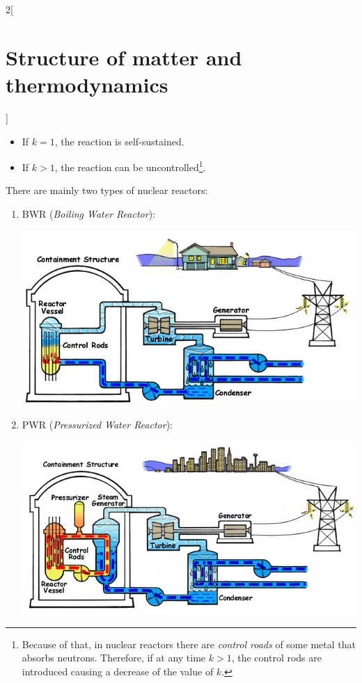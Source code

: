 \documentclass[../../../main_physics.tex]{subfiles}
\begin{document}
\begin{multicols}{2}[\section{Structure of matter and thermodynamics}]
\begin{definition}
\begin{itemize}
      \item If $k=1$, the reaction is self-sustained.
      \item If $k>1$, the reaction can be uncontrolled\footnote{Because of that, in nuclear reactors there are \emph{control roads} of some metal that absorbs neutrons. Therefore, if at any time $k>1$, the control rods are introduced causing a decrease of the value of $k$.}.
    \end{itemize}
  \end{definition}
  \begin{definition}
    There are mainly two types of nuclear reactors:
    \begin{enumerate}
      \item BWR (\emph{Boiling Water Reactor}):
            \begin{center}
              \begin{minipage}{\linewidth}
                \centering
                \includegraphics[width=\linewidth]{Images/bwr.jpg}
              \end{minipage}
            \end{center}
      \item PWR (\emph{Pressurized Water Reactor}):
            \begin{center}
              \begin{minipage}{\linewidth}
                \centering
                \includegraphics[width=\linewidth]{Images/pwr.jpg}

\end{minipage}
\end{center}
\end{enumerate}
\end{definition}
\end{multicols}
\end{document}
